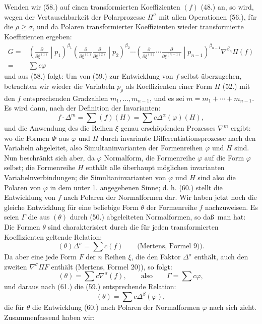 Wenden wir (58.) auf einen transformierten Koeffizienten $(f)$ (48.) an, so wird, wegen der Vertauschbarkeit der Polarprozesse $\Pi^\sigma$ mit allen Operationen (56.), f\"ur die $\rho\ge\sigma$, und da Polaren transformierter Koeffizienten wieder transformierte Koeffizienten ergeben:
\[
\begin{aligned}
 G={}&\left(\frac{\partial}{\partial\xi^{(1)}}\middle|p_1\right)^{\beta_1}
 \left(\frac{\partial}{\partial\xi^{(1)}}\frac{\partial}{\partial\xi^{(2)}}\middle|p_2\right)^{\beta_2}
 \cdots
 \left(\frac{\partial}{\partial\xi^{(1)}}\cdots\frac{\partial}{\partial\xi^{(n-1)}}\middle|p_{n-1}\right)^{\beta_{n-1}}
 \nabla^{\beta_n}\Pi(f)\\
 ={}&\sum c\varphi
\end{aligned}
\]
und aus (58.) folgt:
Um von (59.) zur Entwicklung von $f$ selbst \"uberzugehen, betrachten wir wieder die Variabeln $p_\rho$ als Koeffizienten einer Form $H$ (52.) mit den $f$ entsprechenden Gradzahlen $m_1,\ldots,m_{n-1}$, und es sei $m=m_1+\cdots+m_{n-1}$. Es wird dann, nach der Definition der Invarianten:
\[
 f\cdot\Delta^m=\sum(f)(H)=\sum c\Delta^\alpha(\varphi)(H),
\]
und die Anwendung des die Reihen $\xi$ genau ersch\"opfenden Prozesses $\nabla^m$ ergibt:
wo die Formen $\Phi$ aus $\varphi$ und $H$ durch invariante Differentiationsprozesse nach den Variabeln abgeleitet, also Simultaninvarianten der Formenreihen $\varphi$ und $H$ sind. Nun beschr\"ankt sich aber, da $\varphi$ Normalform, die Formenreihe $\varphi$ auf die Form $\varphi$ selbst; die Formenreihe $H$ enth\"alt alle \"uberhaupt m\"oglichen invarianten Variabelnverbindungen; die Simultaninvarianten von $\varphi$ und $H$ sind also die Polaren von $\varphi$ in dem unter 1. angegebenen Sinne; d. h. (60.) stellt die Entwicklung von $f$ nach Polaren der Normalformen dar. Wir haben jetzt noch die gleiche Entwicklung f\"ur eine beliebige Form $\theta$ der Formenreihe $f$ nachzuweisen. Es seien $\Gamma$ die aus $(\theta)$ durch (50.) abgeleiteten Normalformen, so da\ss\ man hat:
Die Formen $\theta$ sind charakterisiert durch die f\"ur jeden transformierten Koeffizienten geltende Relation:
\[
 (\theta)\Delta^\sigma=\sum c(f)\qquad\text{(Mertens, Formel 9)).}
\]
Da aber eine jede Form $F$ der $n$ Reihen $\xi$, die den Faktor $\Delta^\sigma$ enth\"alt, auch den zweiten $\nabla^\sigma\Pi F$ enth\"alt (Mertens, Formel 20)), so folgt:
\[
 (\theta)=\sum c\nabla^\sigma(f),\qquad\text{also}\qquad \Gamma=\sum c\varphi,
\]
und daraus nach (61.) die (59.) entsprechende Relation:
\[
 (\theta)=\sum c\Delta^\beta(\varphi),
\]
die f\"ur $\theta$ die Entwicklung (60.) nach Polaren der Normalformen $\varphi$ nach sich zieht. Zusammenfassend haben wir:

